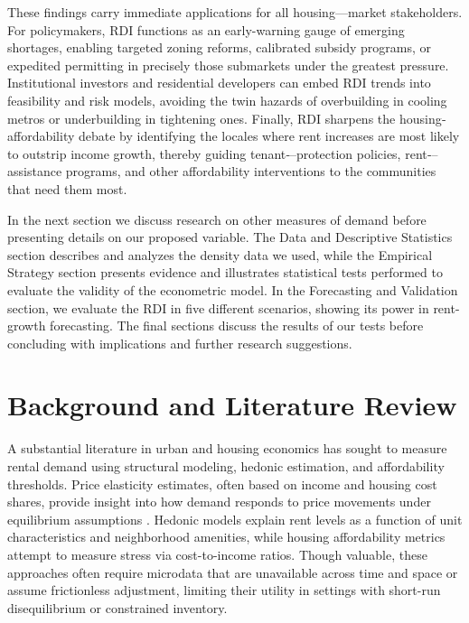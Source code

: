 \documentclass[APA,Times1COL]{WileyNJDv5} %
\begin{document}
These findings carry immediate applications for all housing---market stakeholders. For policymakers, RDI functions as an early-warning gauge of emerging shortages, enabling targeted zoning reforms, calibrated subsidy programs, or expedited permitting in precisely those submarkets under the greatest pressure. Institutional investors and residential developers can embed RDI trends into feasibility and risk models, avoiding the twin hazards of overbuilding in cooling metros or underbuilding in tightening ones. Finally, RDI sharpens the housing‐affordability debate by identifying the locales where rent increases are most likely to outstrip income growth, thereby guiding tenant‐--protection policies, rent‐--assistance programs, and other affordability interventions to the communities that need them most.

In the next section we discuss research on other measures of demand before presenting details on our proposed variable. The Data and Descriptive Statistics section describes and analyzes the density data we used, while the Empirical Strategy section presents evidence and illustrates statistical tests performed to evaluate the validity of the econometric model. In the Forecasting and Validation section, we evaluate the RDI in five different scenarios, showing its power in rent-growth forecasting. The final sections discuss the results of our tests before concluding with implications and further research suggestions. 

\section{Background and Literature Review}
\label{sec2}

A substantial literature in urban and housing economics has sought to measure rental demand using structural modeling, hedonic estimation, and affordability thresholds. Price elasticity estimates, often based on income and housing cost shares, provide insight into how demand responds to price movements under equilibrium assumptions \cite{green2002measuring, malpezzi1996rent}. Hedonic models explain rent levels as a function of unit characteristics and neighborhood amenities, while housing affordability metrics attempt to measure stress via cost-to-income ratios. Though valuable, these approaches often require microdata that are unavailable across time and space or assume frictionless adjustment, limiting their utility in settings with short-run disequilibrium or constrained inventory.
\end{document}
